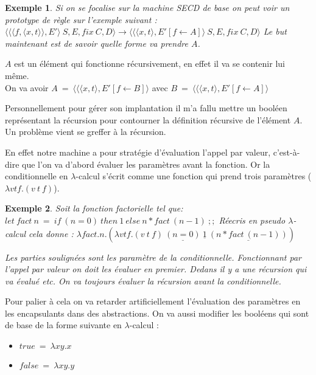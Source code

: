 \documentclass[10pt,a4paper]{report}
\newtheorem{ex}{Exemple}
\begin{document}
	\begin{ex}
		Si on se focalise sur la machine SECD de base on peut voir un prototype de règle sur l'exemple suivant :
		\smallbreak
		$\langle \langle\langle f,\langle x,t\rangle\rangle,E'\rangle~S,E,fix~C,D\rangle
		\longrightarrow \langle \langle \langle x,t\rangle,E'[f \leftarrow A]\rangle~S,E,fix~C,D\rangle$
		\medbreak
		Le but maintenant est de savoir quelle forme va prendre $A$. 
	\end{ex} 

	$A$ est un élément qui fonctionne récursivement, en effet il va se contenir lui même. 
	\\
	On va avoir $A~=~\langle \langle \langle x,t\rangle,E'[f \leftarrow B]\rangle$ avec $B~=~\langle \langle \langle x,t\rangle,E'[f \leftarrow A]\rangle$
	\medbreak
	
	Personnellement pour gérer son implantation il m'a fallu mettre un booléen représentant la récursion pour contourner la définition récursive de l'élément $A$. Un problème vient se greffer à la récursion. 
	\medbreak
	
	En effet notre machine a pour stratégie d'évaluation l'appel par valeur, c'est-à-dire que l'on va d'abord évaluer les paramètres avant la fonction. Or la conditionnelle en $\lambda$-calcul s'écrit comme une fonction qui prend trois paramètres ($\lambda vtf.(v~t~f)$). 
	\smallbreak
	\begin{ex}
		Soit la fonction factorielle tel que:
		\smallbreak
		$let~fact~n~=~if~(n=0)~then~1~else~n*fact~(n-1)~;;$
		\smallbreak
		Réecris en pseudo $\lambda$-calcul cela donne :
		\smallbreak
		$\lambda fact.n.(\lambda vtf.(v~t~f)~\underline{(n = 0)}~\underline{1}~\underline{(n*fact~(n-1))})$
		\medbreak
		
		Les parties soulignées sont les paramètre de la conditionnelle. Fonctionnant par l'appel par valeur on doit les évaluer en premier. Dedans il y a une récursion qui va évalué etc. On va toujours évaluer la récursion avant la conditionnelle.
	\end{ex}
	\bigbreak
	
	 Pour palier à cela on va retarder artificiellement l'évaluation des paramètres en les encapsulants dans des abstractions. On va aussi modifier les booléens qui sont de base de la forme suivante en $\lambda$-calcul :
	 \begin{itemize}
	 	\item[] $true~=~\lambda xy.x$
	 	\item[] $false~=~\lambda xy.y$
	 \end{itemize}
	\bigbreak
	
\end{document}
